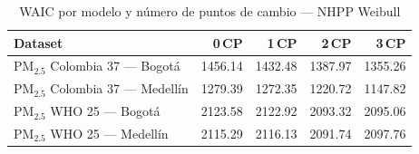 \begin{table}[htbp]
\centering
\caption{WAIC por modelo y n\'{u}mero de puntos de cambio --- NHPP Weibull}
\label{tab:nhpp_waic}
\begin{tabular}{lrrrr}
\toprule
Dataset & 0\,CP & 1\,CP & 2\,CP & 3\,CP \\
\midrule
PM$_{2.5}$ Colombia 37 --- Bogot\'{a} & 1456.14 & 1432.48 & 1387.97 & 1355.26 \\
PM$_{2.5}$ Colombia 37 --- Medell\'{i}n & 1279.39 & 1272.35 & 1220.72 & 1147.82 \\
PM$_{2.5}$ WHO 25 --- Bogot\'{a} & 2123.58 & 2122.92 & 2093.32 & 2095.06 \\
PM$_{2.5}$ WHO 25 --- Medell\'{i}n & 2115.29 & 2116.13 & 2091.74 & 2097.76 \\
\bottomrule
\end{tabular}
\end{table}
